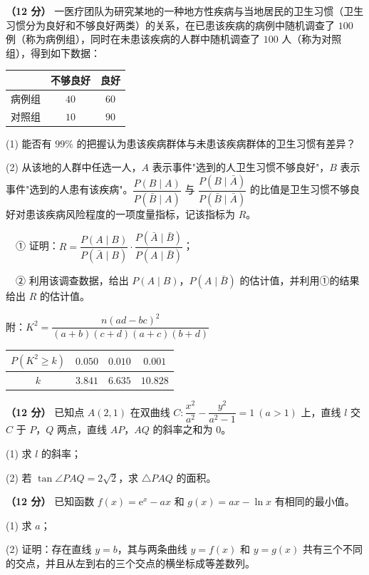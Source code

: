\begin{question}
\textbf{（12 分）} 一医疗团队为研究某地的一种地方性疾病与当地居民的卫生习惯（卫生习惯分为良好和不够良好两类）的关系，在已患该疾病的病例中随机调查了 $100$ 例（称为病例组），同时在未患该疾病的人群中随机调查了 $100$ 人（称为对照组），得到如下数据：

\begin{center}
\begin{tabular}{lcc}
\toprule
 & 不够良好 & 良好 \\
\midrule
病例组 & $40$ & $60$ \\
对照组 & $10$ & $90$ \\
\bottomrule
\end{tabular}
\end{center}

  (1) 能否有 $99\%$ 的把握认为患该疾病群体与未患该疾病群体的卫生习惯有差异？

  (2) 从该地的人群中任选一人，$A$ 表示事件"选到的人卫生习惯不够良好"，$B$ 表示事件"选到的人患有该疾病"。$\dfrac{P(B\mid A)}{P(\bar B\mid A)}$ 与 $\dfrac{P(B\mid\bar A)}{P(\bar B\mid\bar A)}$ 的比值是卫生习惯不够良好对患该疾病风险程度的一项度量指标，记该指标为 $R$。

  　① 证明：$R=\dfrac{P(A\mid B)}{P(\bar A\mid B)}\cdot\dfrac{P(\bar A\mid\bar B)}{P(A\mid\bar B)}$；

  　② 利用该调查数据，给出 $P(A\mid B)$，$P(A\mid\bar B)$ 的估计值，并利用①的结果给出 $R$ 的估计值。

  附：$K^{2}=\dfrac{n(ad-bc)^{2}}{(a+b)(c+d)(a+c)(b+d)}$

\begin{center}
\begin{tabular}{cccc}
\toprule
$P\left(K^{2}\ge k\right)$ & $0.050$ & $0.010$ & $0.001$ \\
\midrule
$k$ & $3.841$ & $6.635$ & $10.828$ \\
\bottomrule
\end{tabular}
\end{center}

\end{question}
\begin{question}
\textbf{（12 分）} 已知点 $A(2,1)$ 在双曲线 $C:\dfrac{x^{2}}{a^{2}}-\dfrac{y^{2}}{a^{2}-1}=1\ (a>1)$ 上，直线 $l$ 交 $C$ 于 $P$，$Q$ 两点，直线 $AP$，$AQ$ 的斜率之和为 $0$。

  (1) 求 $l$ 的斜率；

  (2) 若 $\tan\angle PAQ=2\sqrt2$，求 $\triangle PAQ$ 的面积。

\end{question}
\begin{question}
\textbf{（12 分）} 已知函数 $f(x)=\mathrm e^{x}-ax$ 和 $g(x)=ax-\ln x$ 有相同的最小值。

  (1) 求 $a$；

  (2) 证明：存在直线 $y=b$，其与两条曲线 $y=f(x)$ 和 $y=g(x)$ 共有三个不同的交点，并且从左到右的三个交点的横坐标成等差数列。

\par\medskip


\end{question}